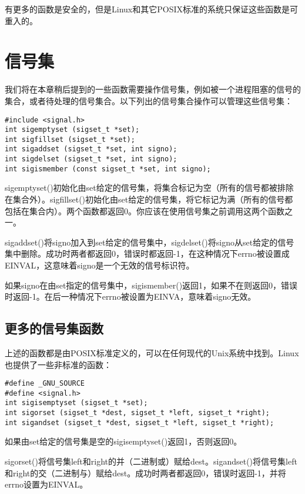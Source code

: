 有更多的函数是安全的，但是Linux和其它POSIX标准的系统只保证这些函数是可重入的。

\section{信号集}

我们将在本章稍后提到的一些函数需要操作信号集，例如被一个进程阻塞的信号的集合，或者待处理的信号集合。以下列出的信号集合操作可以管理这些信号集：

\begin{lstlisting}
#include <signal.h>
int sigemptyset (sigset_t *set);
int sigfillset (sigset_t *set);
int sigaddset (sigset_t *set, int signo);
int sigdelset (sigset_t *set, int signo);
int sigismember (const sigset_t *set, int signo);
\end{lstlisting}

sigemptyset()初始化由set给定的信号集，将集合标记为空（所有的信号都被排除在集合外）。sigfillset()初始化由set给定的信号集，将它标记为满（所有的信号都包括在集合内）。两个函数都返回0。你应该在使用信号集之前调用这两个函数之一。

sigaddset()将signo加入到set给定的信号集中，sigdelset()将signo从set给定的信号集中删除。成功时两者都返回0，错误时都返回-1，在这种情况下errno被设置成EINVAL，这意味着signo是一个无效的信号标识符。

如果signo在由set指定的信号集中，sigismember()返回1，如果不在则返回0，错误时返回-1。在后一种情况下errno被设置为EINVA，意味着signo无效。

\subsection{更多的信号集函数}

上述的函数都是由POSIX标准定义的，可以在任何现代的Unix系统中找到。Linux也提供了一些非标准的函数：

\begin{lstlisting}
#define _GNU_SOURCE
#define <signal.h>
int sigisemptyset (sigset_t *set);
int sigorset (sigset_t *dest, sigset_t *left, sigset_t *right);
int sigandset (sigset_t *dest, sigset_t *left, sigset_t *right);
\end{lstlisting}

如果由set给定的信号集是空的sigisemptyset()返回1，否则返回0。

sigorset()将信号集left和right的并（二进制或）赋给dest。sigandset()将信号集left和right的交（二进制与）赋给dest。成功时两者都返回0，错误时返回-1，并将errno设置为EINVAL。

